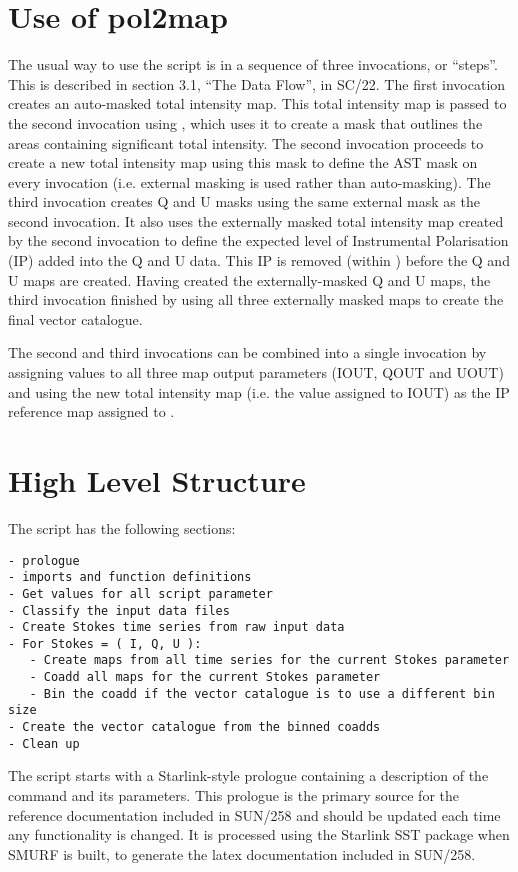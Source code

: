 \documentclass[twoside,11pt]{starlink}
\begin{document}
\section{Use of pol2map}
The usual way to use the \ptmap script is in a sequence of
three invocations, or ``steps''. This is described in section 3.1, ``The
Data Flow'', in SC/22. The first invocation creates an auto-masked total
intensity map. This total intensity map is passed to the second
invocation using , which uses it to create a mask
that outlines the areas containing significant total intensity. The
second invocation proceeds to create a new total intensity map using this
mask to define the AST mask on every invocation (i.e. external masking is
used rather than auto-masking). The third invocation creates Q and U
masks using the same external mask as the second invocation. It also uses
the externally masked total intensity map created by the second
invocation to define the expected level of Instrumental Polarisation (IP)
added into the Q and U data. This IP is removed (within \mmap)
before the Q and U maps are created. Having created the externally-masked
Q and U maps, the third invocation finished by using all three externally
masked maps to create the final vector catalogue.

The second and third invocations can be combined into a single invocation
by assigning values to all three map output parameters (IOUT, QOUT and
UOUT) and using the new total intensity map (i.e. the value assigned to
IOUT) as the IP reference map assigned to .


\section{High Level Structure}

The \ptmap script has the following sections:

\begin{verbatim}
- prologue
- imports and function definitions
- Get values for all script parameter
- Classify the input data files
- Create Stokes time series from raw input data
- For Stokes = ( I, Q, U ):
   - Create maps from all time series for the current Stokes parameter
   - Coadd all maps for the current Stokes parameter
   - Bin the coadd if the vector catalogue is to use a different bin size
- Create the vector catalogue from the binned coadds
- Clean up
\end{verbatim}


The \ptmap script starts with a Starlink-style prologue
containing a description of the command and its parameters. This prologue
is the primary source for the reference documentation included in SUN/258
and should be updated each time any functionality is changed. It is
processed using the Starlink SST package when SMURF is built, to generate
the latex documentation included in SUN/258.
\end{document}
